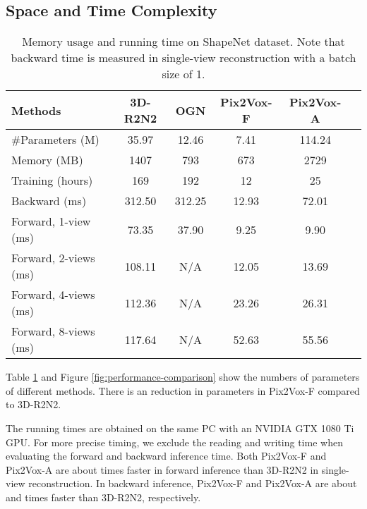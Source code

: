 \documentclass[10pt,twocolumn,letterpaper]{article}
\begin{document}
\subsection{Space and Time Complexity}
\begin{table}
  \caption{Memory usage and running time on ShapeNet dataset. Note that backward time is measured in single-view reconstruction with a batch size of 1.}
  \vspace{-2 mm}
  \centering
  \resizebox{\linewidth}{!} {
    \begin{tabular}{lccccc}
    \toprule
    Methods               & 3D-R2N2   & OGN
                          & Pix2Vox-F & Pix2Vox-A \\
    \midrule
    \#Parameters (M)      & 35.97     & 12.46
                          & 7.41      & 114.24 \\
    Memory (MB)           & 1407      & 793
                          & 673       & 2729 \\
    \midrule
    Training (hours)      & 169       & 192
                          & 12        & 25 \\
    Backward (ms)         & 312.50    & 312.25
                          & 12.93     & 72.01 \\
    \midrule
    Forward, 1-view (ms)  & 73.35     & 37.90
                          & 9.25      & 9.90 \\
    Forward, 2-views (ms) & 108.11    & N/A
                          & 12.05     & 13.69 \\
    Forward, 4-views (ms) & 112.36    & N/A
                          & 23.26     & 26.31 \\
    Forward, 8-views (ms) & 117.64    & N/A
                          & 52.63     & 55.56 \\
    \bottomrule
    \end{tabular}
  }
  \label{tab:performance-comparison}
  \vspace{-2 mm}
\end{table}

Table \ref{tab:performance-comparison} and Figure \ref{fig:performance-comparison} show the numbers of parameters of different methods.
There is an  reduction in parameters in Pix2Vox-F compared to 3D-R2N2.

The running times are obtained on the same PC with an NVIDIA GTX 1080 Ti GPU.
For more precise timing, we exclude the reading and writing time when evaluating the forward and backward inference time.
Both Pix2Vox-F and Pix2Vox-A are about  times faster in forward inference than 3D-R2N2 in single-view reconstruction.
In backward inference, Pix2Vox-F and Pix2Vox-A are about  and  times faster than 3D-R2N2, respectively.
\end{document}
